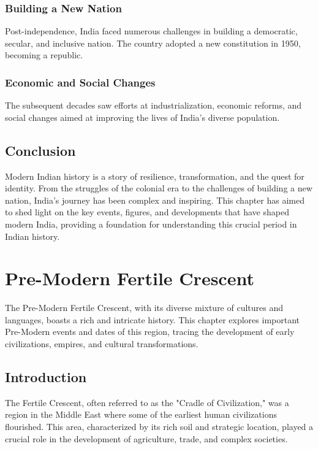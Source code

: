 \documentclass{book}
\begin{document}
\subsection{Building a New Nation}
Post-independence, India faced numerous challenges in building a democratic, secular, and inclusive nation. The country adopted a new constitution in 1950, becoming a republic.

\subsection{Economic and Social Changes}
The subsequent decades saw efforts at industrialization, economic reforms, and social changes aimed at improving the lives of India’s diverse population.

\section{Conclusion}
\label{sec:conclusion-modern-india}
Modern Indian history is a story of resilience, transformation, and the quest for identity. From the struggles of the colonial era to the challenges of building a new nation, India’s journey has been complex and inspiring. This chapter has aimed to shed light on the key events, figures, and developments that have shaped modern India, providing a foundation for understanding this crucial period in Indian history.

\chapter{Pre-Modern Fertile Crescent}
\label{ch:pre-modern-fertile-crescent}

The Pre-Modern Fertile Crescent, with its diverse mixture of cultures and languages, boasts a rich and intricate history. This chapter explores important Pre-Modern events and dates of this region, tracing the development of early civilizations, empires, and cultural transformations.

\section{Introduction}
\label{sec:introduction-fertile-crescent}

The Fertile Crescent, often referred to as the "Cradle of Civilization," was a region in the Middle East where some of the earliest human civilizations flourished. This area, characterized by its rich soil and strategic location, played a crucial role in the development of agriculture, trade, and complex societies.
\end{document}
